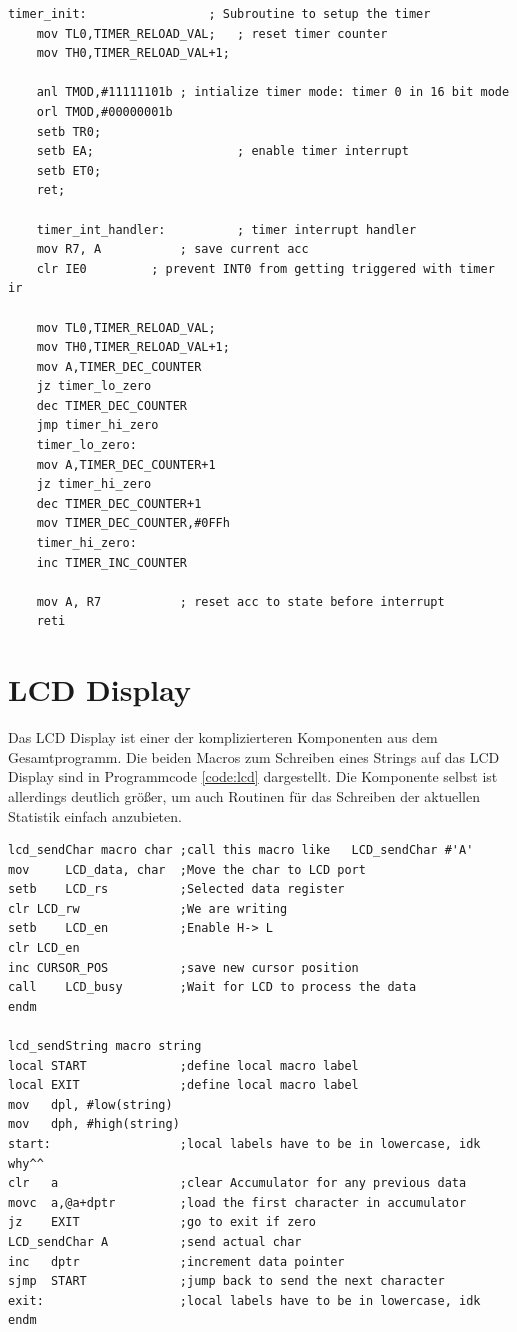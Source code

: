 \noindent
\begin{minipage}[th]{\textwidth}
	\vspace{1em}
	\begin{lstlisting}[caption=Quellcode-Ausschnitt für die Timerverwaltung, label=code:timer]
	timer_init:					; Subroutine to setup the timer
	mov TL0,TIMER_RELOAD_VAL;	; reset timer counter
	mov TH0,TIMER_RELOAD_VAL+1;
	
	anl TMOD,#11111101b	; intialize timer mode: timer 0 in 16 bit mode
	orl TMOD,#00000001b
	setb TR0;
	setb EA;					; enable timer interrupt
	setb ET0;
	ret;
	
	timer_int_handler:			; timer interrupt handler
	mov R7, A 			; save current acc
	clr IE0			; prevent INT0 from getting triggered with timer ir
	
	mov TL0,TIMER_RELOAD_VAL;
	mov TH0,TIMER_RELOAD_VAL+1;
	mov A,TIMER_DEC_COUNTER
	jz timer_lo_zero
	dec TIMER_DEC_COUNTER
	jmp timer_hi_zero
	timer_lo_zero:
	mov A,TIMER_DEC_COUNTER+1
	jz timer_hi_zero
	dec TIMER_DEC_COUNTER+1
	mov TIMER_DEC_COUNTER,#0FFh
	timer_hi_zero:
	inc TIMER_INC_COUNTER
	
	mov A, R7			; reset acc to state before interrupt
	reti
	\end{lstlisting}
\end{minipage}

\section{LCD Display}

Das LCD Display ist einer der komplizierteren Komponenten aus dem Gesamtprogramm. Die beiden Macros zum Schreiben eines Strings auf das LCD Display sind in Programmcode \ref{code:lcd} dargestellt. Die Komponente selbst ist allerdings deutlich größer, um auch Routinen für das Schreiben der aktuellen Statistik einfach anzubieten.

\noindent
\begin{minipage}[th]{\textwidth}
	\vspace{1em}
	\begin{lstlisting}[caption=Quellcode-Ausschnitt für das LCD Display, label=code:lcd]
lcd_sendChar macro char	;call this macro like   LCD_sendChar #'A'
mov   	LCD_data, char 	;Move the char to LCD port
setb	LCD_rs			;Selected data register
clr	LCD_rw				;We are writing
setb	LCD_en			;Enable H-> L
clr	LCD_en
inc	CURSOR_POS			;save new cursor position
call	LCD_busy		;Wait for LCD to process the data
endm

lcd_sendString macro string
local START				;define local macro label
local EXIT				;define local macro label
mov   dpl, #low(string)
mov   dph, #high(string)
start:					;local labels have to be in lowercase, idk why^^
clr   a                 ;clear Accumulator for any previous data
movc  a,@a+dptr         ;load the first character in accumulator
jz    EXIT              ;go to exit if zero
LCD_sendChar A			;send actual char
inc   dptr              ;increment data pointer
sjmp  START    			;jump back to send the next character
exit:					;local labels have to be in lowercase, idk
endm

	\end{lstlisting}
\end{minipage}

